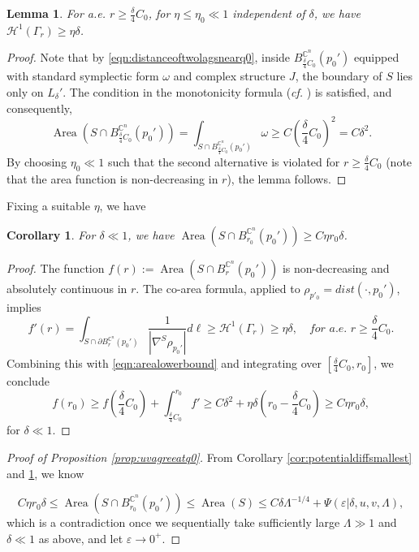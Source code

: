 \documentclass[11pt,a4paper]{article}
\numberwithin{equation}{section}%
\newtheorem{lem}[thm]{Lemma}
\newtheorem{cor}[thm]{Corollary}
\theoremstyle{definition}
\newcommand{\cf}{\emph{cf.} }
\newcommand{\C}{\mathbb{C}}
\begin{document}
\begin{lem}
    For a.e. $r\geqslant \frac{\delta}{4}C_0$, for $\eta\leqslant\eta_0\ll 1$ independent of $\delta$, we have $\mathcal{H}^1(\Gamma_r)\geqslant \eta\delta$.  
\end{lem}
\begin{proof}
    Note that by \eqref{eqn:distanceoftwolagsnearq0}, inside $B_{\frac{\delta}{4}C_0}^{\C^n}(p_0')$ equipped with standard symplectic form $\omega$ and complex structure $J$, the boundary of $S$ lies only on $L_\delta'$. The condition in the monotonicity formula (\cf \cite[Lemma 45]{LiS}) is satisfied, and consequently,
     \begin{equation}
         \label{eqn:arealowerbound}
         \operatorname{Area}(S\cap B_{\frac{\delta}{4}C_0}^{\C^n}(p_0'))=\int_{S\cap B_{\frac{\delta}{4}C_0}^{\C^n}(p_0')}\omega\geqslant C\left(\frac{\delta}{4}C_0\right)^2=C\delta^2.
     \end{equation} By choosing $\eta_0\ll 1$ such that the second alternative is violated for $r\geqslant \frac{\delta}{4}C_0$ (note that the area function is non-decreasing in $r$), the lemma follows. 
\end{proof}
Fixing a suitable $\eta$, we have
\begin{cor}\label{cor:arealowerbound}
    For $\delta\ll 1$, we have $\operatorname{Area}(S\cap B_{r_0}^{\C^n}(p_0'))\geqslant C\eta  r_0 \delta$. 
\end{cor}
\begin{proof}
    The function $f(r):=\operatorname{Area}(S\cap B_{r}^{\C^n}(p_0'))$ is non-decreasing and absolutely continuous in $r$. The co-area formula, applied to $\rho_{p'_0}=dist(\cdot, p_0')$, implies
    $$f'(r)=\int_{S\cap \partial B_r^{\C^n}(p_0')}\frac{1}{|\nabla^S\rho_{p_0'}|}d\ell\geqslant \mathcal{H}^1(\Gamma_r)\geqslant \eta \delta,\quad \textit{for a.e. } r\geqslant \frac{\delta}{4}C_0.$$ 
    Combining this with \eqref{eqn:arealowerbound} and integrating over $[\frac{\delta}{4}C_0,r_0]$, we conclude
    $$f(r_0)\geqslant f\left(\frac{\delta}{4}C_0\right)+\int_{\frac{\delta}{4}C_0}^{r_0}f'\geqslant C\delta^2+\eta\delta\left(r_0-\frac{\delta}{4}C_0\right)\geqslant C\eta  r_0 \delta,$$
    for $\delta\ll 1$. 
\end{proof}
\begin{proof}[Proof of Proposition \ref{prop:uvagreeatq0}]
    From Corollary \ref{cor:potentialdiffsmallest} and \ref{cor:arealowerbound}, we know

    $$C\eta  r_0 \delta\leqslant\operatorname{Area}(S\cap B_{r_0}^{\C^n}(p_0'))\leqslant \operatorname{Area}(S)\leqslant C\delta \Lambda^{-1/4}+\Psi(\varepsilon|\delta,u,v,\Lambda),$$
    which is a contradiction once we sequentially take sufficiently large $\Lambda\gg 1$ and $\delta\ll 1$ as above, and let $\varepsilon\to 0^+$. 
\end{proof}
\end{document}
